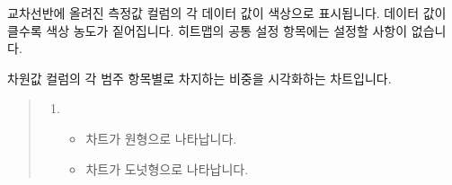 \documentclass[letterpaper,10pt,english]{sphinxmanual}
\begin{document}

교차선반에 올려진 측정값 컬럼의 각 데이터 값이 색상으로 표시됩니다. 데이터 값이 클수록 색상 농도가 짙어집니다. 히트맵의 공통 설정 항목에는 설정할 사항이 없습니다.
\begin{quote}

\begin{figure}[H]
\centering

\noindent{}
\end{figure}
\end{quote}


차원값 컬럼의 각 범주 항목별로 차지하는 비중을 시각화하는 차트입니다.
\begin{quote}

\begin{figure}[H]
\centering

\noindent{}
\end{figure}
\begin{enumerate}
\def\theenumi{\arabic{enumi}}
\def\labelenumi{\theenumi .}
\makeatletter\def\p@enumii{\p@enumi \theenumi .}\makeatother
\item {} 
\begin{itemize}
\item {} 
 차트가 원형으로 나타납니다.

\item {} 
 차트가 도넛형으로 나타납니다.

\end{itemize}

\end{enumerate}
\end{quote}
\end{document}
